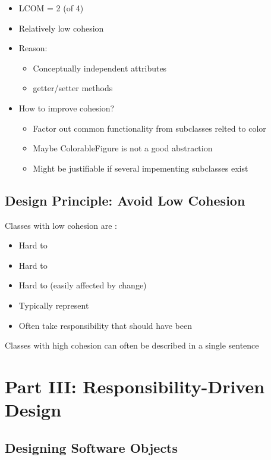 \begin{center}
    \begin{itemize}
        \item LCOM = 2 (of 4)
        \item Relatively low cohesion
        \item Reason:
        \begin{itemize}
            \item Conceptually independent attributes
            \item getter/setter methods
        \end{itemize}
        \item How to improve cohesion?
        \begin{itemize}
            \item Factor out common functionality from subclasses relted to color
            \item Maybe ColorableFigure is not a good abstraction
            \item Might be justifiable if several impementing subclasses exist
        \end{itemize}
    \end{itemize}
\end{center}
\subsection{Design Principle: Avoid Low Cohesion}
Classes with low cohesion are :
\begin{itemize}
    \item Hard to 
    \item Hard to 
    \item Hard to  (easily affected by change)
    \item Typically represent 
    \item Often take responsibility that should have been 
\end{itemize}
\begin{defBox}
     Classes with high cohesion can often be described in a single sentence
\end{defBox}
\section{Part III: Responsibility-Driven Design}
\subsection{Designing Software Objects}
